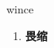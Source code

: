
\begin{frame}
{\huge wince}
\begin{center}
\begin{enumerate}\Large
  \item \textbf{畏缩}
\end{enumerate}
\end{center}
\end{frame}
